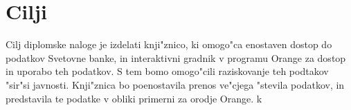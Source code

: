 \section{Cilji}

Cilj diplomske naloge je izdelati knji"znico, ki omogo"ca enostaven dostop do
podatkov Svetovne banke, in interaktivni gradnik v programu Orange za dostop in
uporabo teh podatkov. S tem bomo omogo"cili raziskovanje teh podtakov "sir"si
javnosti. Knji"znica bo poenostavila prenos ve"cjega "stevila podatkov, in
predstavila te podatke v obliki primerni za orodje Orange. k

